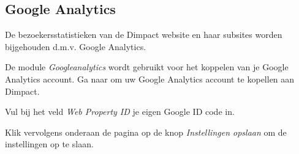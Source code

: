 \subsection{Google Analytics}\label{googleanalytics}
De bezoekersstatistieken van de Dimpact website en haar subsites worden bijgehouden d.m.v. Google Analytics.

De module \emph{Googleanalytics}  wordt gebruikt voor het koppelen van je Google Analytics account. Ga naar  om uw Google Analytics account te kopellen aan Dimpact. 

Vul bij het veld \emph{Web Property ID} je eigen Google ID code in. 

Klik vervolgens onderaan de pagina op de knop \emph{Instellingen opslaan} om de instellingen op te slaan.